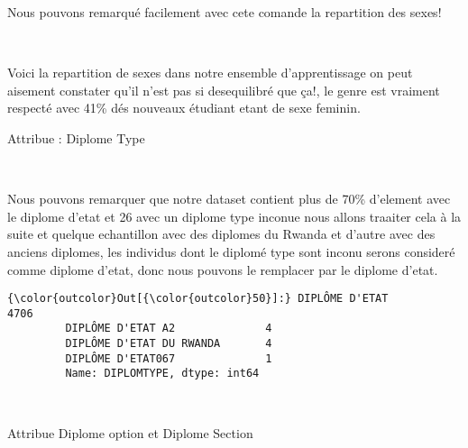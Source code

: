 \documentclass[11pt]{article}
\begin{document}
    Nous pouvons remarqué facilement avec cete comande la repartition des
sexes!

    \begin{center}
    \end{center}
    { \hspace*{\fill} \\}
    
    Voici la repartition de sexes dans notre ensemble d'apprentissage on
peut aisement constater qu'il n'est pas si desequilibré que ça!, le
genre est vraiment respecté avec 41\% dés nouveaux étudiant etant de
sexe feminin.

    Attribue : Diplome Type

    \begin{center}
    \end{center}
    { \hspace*{\fill} \\}
    
    Nous pouvons remarquer que notre dataset contient plus de 70\% d'element
avec le diplome d'etat et 26 avec un diplome type inconue nous allons
traaiter cela à la suite et quelque echantillon avec des diplomes du
Rwanda et d'autre avec des anciens diplomes, les individus dont le
diplomé type sont inconu serons consideré comme diplome d'etat, donc
nous pouvons le remplacer par le diplome d'etat.

            \begin{Verbatim}[commandchars=\\\{\}]
{\color{outcolor}Out[{\color{outcolor}50}]:} DIPLÔME D'ETAT              4706
         DIPLÔME D'ETAT A2              4
         DIPLÔME D'ETAT DU RWANDA       4
         DIPLÔME D'ETAT067              1
         Name: DIPLOMTYPE, dtype: int64
\end{Verbatim}
        
    \begin{center}
    \end{center}
    { \hspace*{\fill} \\}
    
    Attribue Diplome option et Diplome Section
\end{document}
